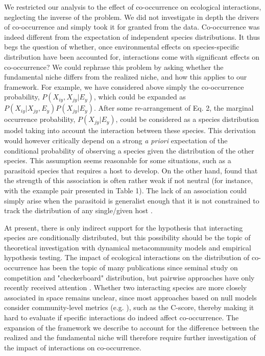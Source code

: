 \documentclass[12pt]{article}
\begin{document}
We restricted our analysis to the effect of co-occurrence on ecological
interactions, neglecting the inverse of the problem. We did not investigate in
depth the drivers of co-occurrence and simply took it for granted from the
data. Co-occurrence was indeed different from the expectation of independent
species distributions. It thus begs the question of whether, once
environmental effects on species-specific distribution have been accounted
for, interactions come with significant effects on co-occurrence? We could
rephrase this problem by asking whether the fundamental niche differs from the
realized niche, and how this applies to our framework. For example, we have
considered above simply the co-occurrence probability, $P(X_{iy},X_{jy}|E_y)$,
which could be expanded as $P(X_{iy}|X_{jy},E_y) P(X_{jy}| E_y )$. After some
re-arrangement of Eq. 2, the marginal occurrence probability, $P(X_{jy}|E_y
)$, could be considered as a species distribution model taking into account
the interaction between these species. This derivation would however
critically depend on a strong \emph{a priori} expectation of the conditional
probability of observing a species given the distribution of the other
species. This assumption seems reasonable for some situations, such as a
parasitoid species that requires a host to develop. On the other hand,
\citet{Cazelles2016b} found that the strength of this association is often
rather weak if not neutral (for instance, with the example pair presented in
Table 1). The lack of an association could simply arise when the parasitoid is
generalist enough that it is not constrained to track the distribution of any
single/given host \citep{Cazelles2015}.

At present, there is only indirect support for the hypothesis that interacting
species are conditionally distributed, but this possibility should be the
topic of theoretical investigation with dynamical metacommunity models \citep{Cazelles2015} and empirical hypothesis testing. The impact of ecological
interactions on the distribution of co-occurrence has been the topic of many
publications since \citet{Diamond1975} seminal study on competition and
"checkerboard" distribution, but pairwise approaches have only recently
received attention \citep{Veech2013}. Whether two interacting species are more
closely associated in space remains unclear, since most approaches based on
null models consider community-level metrics (e.g. \citealt{Gotelli2000}),
such as the C-score, thereby making it hard to evaluate if specific
interactions do indeed affect co-occurrence. The expansion of the framework we
describe to account for the difference between the realized and the
fundamental niche will therefore require further investigation of the impact
of interactions on co-occurrence.
\end{document}
